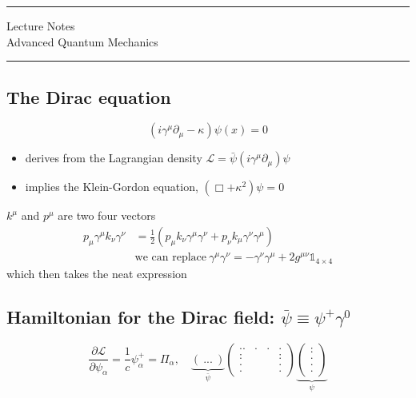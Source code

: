 \documentclass[11pt]{article}
\author{Aayush Arya}
\title{}
\date{January 26, 2023}
\newcommand{\lag}{\mathcal{L}}
\begin{document}
	\maketitle
	
	\hrule
	\begin{center}
		Lecture Notes\\
		Advanced Quantum Mechanics
	\end{center}
	\hrule 
	
	\vspace{11pt}
	
	\subsection*{The Dirac equation}
	\[ (i\gamma^\mu \partial_\mu - \kappa)\psi(x) = 0\]
		
		\begin{itemize}
			\item derives from the Lagrangian density $\lag = \bar{\psi} (i\gamma^\mu \partial_\mu)\psi$
			\item implies the Klein-Gordon equation, $(\Box + \kappa^2) \psi = 0$
		\end{itemize}
		
		$k^\mu$ and $p^\mu$ are two four vectors
			\begin{align*}
				p_\mu \gamma^\mu k_\nu \gamma^\nu &= \frac{1}{2}(p_\mu k_\nu \gamma^\mu \gamma^\nu + p_\nu k_\mu \gamma^\nu \gamma^\mu)\\
				    & \text{we can replace}\ \gamma^\mu \gamma^\nu = -\gamma^\nu \gamma^\mu + 2g^{\mu\nu} \mathbb{1}_{4\times 4}
			\end{align*}
		which then takes the neat expression
		\begin{center}
		\end{center}
	\subsection*{Hamiltonian for the Dirac field: $\bar{\psi}\equiv \psi^+\gamma^0$}
	
	\[ \frac{\partial \lag}{\partial \psi_\alpha} = \frac{1}{c} \psi^+_\alpha = \Pi_\alpha, \quad \underbrace{(\ ... \ )}_{\bar{\psi}} \begin{pmatrix} .. & . & . & . \\ : &  & & : \\
			. &  & & .\\ 
			. & & & .\end{pmatrix}
		\underbrace{\begin{pmatrix}
				: \\ .\\. \\.
		\end{pmatrix}}_{\psi} \]
	
\end{document}
